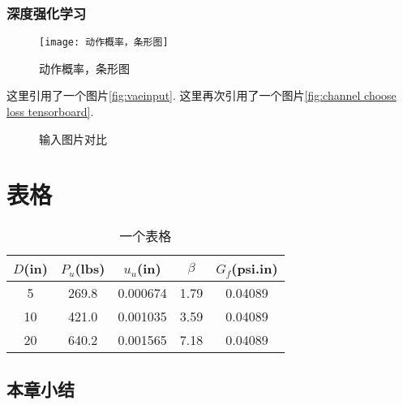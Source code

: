 \subsection{深度强化学习}
\begin{figure}[h]
	\centering
	\texttt{[image: 动作概率，条形图]}
	\caption{动作概率，条形图}
\end{figure}

这里引用了一个图片\ref{fig:vaeinput}.
这里再次引用了一个图片\ref{fig:channel choose loss tensorboard}.

\begin{figure}[htbp]
	\begin{minipage}{\textwidth}
		\centering
		\subfigure{\label{fig:vaeinput}}\addtocounter{subfigure}{-2}
		\hspace{1em}
		\subfigure{\label{fig:vaeinput2}}\addtocounter{subfigure}{-2}
		\hspace{1em}
		\subfigure{\label{fig:vaeinput3}}\addtocounter{subfigure}{-2}
		\hspace{1em}
		\subfigure{\label{fig:vaeinput4}}\addtocounter{subfigure}{-2}
	\end{minipage}
	\vspace{0.2em}
\caption{输入图片对比}\label{fig:vaemnist}
\end{figure}



\chapter{表格}

\begin{table}[htbp]
	\caption{一个表格}\label{tab:一个表格}
	\vspace{0.5em}\centering\wuhao
	\begin{tabular}{ccccc}
		\toprule[1.5pt]
		$D$(in) & $P_u$(lbs) & $u_u$(in) & $\beta$ & $G_f$(psi.in)\\
		\midrule[1pt]
		5 & 269.8 & 0.000674 & 1.79 & 0.04089\\
		10 & 421.0 & 0.001035 & 3.59 & 0.04089\\
		20 & 640.2 & 0.001565 & 7.18 & 0.04089\\
		\bottomrule[1.5pt]
	\end{tabular}
\end{table}



\section{本章小结}